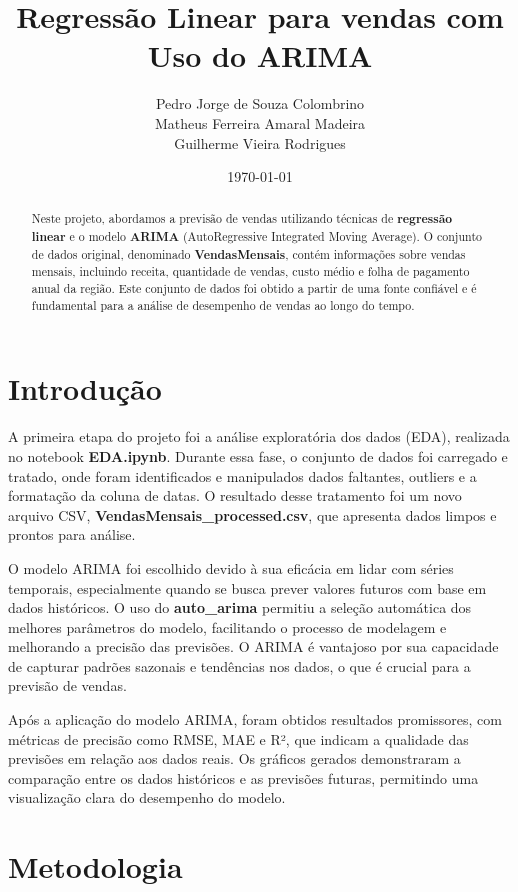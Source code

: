 \documentclass[a4paper,12pt]{article}
\title{Regressão Linear para vendas com Uso do ARIMA}
\author{Pedro Jorge de Souza Colombrino \\ Matheus Ferreira Amaral Madeira \\ Guilherme Vieira Rodrigues }
\date{\today}
\begin{document}
\maketitle

\begin{abstract}
    Neste projeto, abordamos a previsão de vendas utilizando técnicas de \textbf{regressão linear} e o modelo \textbf{ARIMA} (AutoRegressive Integrated Moving Average). O conjunto de dados original, denominado \textbf{VendasMensais}, contém informações sobre vendas mensais, incluindo receita, quantidade de vendas, custo médio e folha de pagamento anual da região. Este conjunto de dados foi obtido a partir de uma fonte confiável e é fundamental para a análise de desempenho de vendas ao longo do tempo.
\end{abstract}

\section{Introdução}

A primeira etapa do projeto foi a análise exploratória dos dados (EDA), realizada no notebook \textbf{EDA.ipynb}. Durante essa fase, o conjunto de dados foi carregado e tratado, onde foram identificados e manipulados dados faltantes, outliers e a formatação da coluna de datas. O resultado desse tratamento foi um novo arquivo CSV, \textbf{VendasMensais\_processed.csv}, que apresenta dados limpos e prontos para análise.

O modelo ARIMA foi escolhido devido à sua eficácia em lidar com séries temporais, especialmente quando se busca prever valores futuros com base em dados históricos. O uso do \textbf{auto\_arima} permitiu a seleção automática dos melhores parâmetros do modelo, facilitando o processo de modelagem e melhorando a precisão das previsões. O ARIMA é vantajoso por sua capacidade de capturar padrões sazonais e tendências nos dados, o que é crucial para a previsão de vendas.

Após a aplicação do modelo ARIMA, foram obtidos resultados promissores, com métricas de precisão como RMSE, MAE e R², que indicam a qualidade das previsões em relação aos dados reais. Os gráficos gerados demonstraram a comparação entre os dados históricos e as previsões futuras, permitindo uma visualização clara do desempenho do modelo.

\section{Metodologia}
\end{document}
